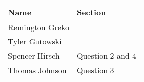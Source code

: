 \documentclass{article}
\begin{document}
\pagebreak

\begin{center}
    \begin{tabular}{|p{3cm}|p{6cm}|}
        \hline
        \textbf{Name} & \textbf{Section} \\
        \hline
        Remington Greko &  \\
        \hline
        Tyler Gutowski &  \\
        \hline
        Spencer Hirsch &  Question 2 and 4\\
        \hline
        Thomas Johnson &  Question 3\\
        \hline
    \end{tabular}
\end{center}
\end{document}
